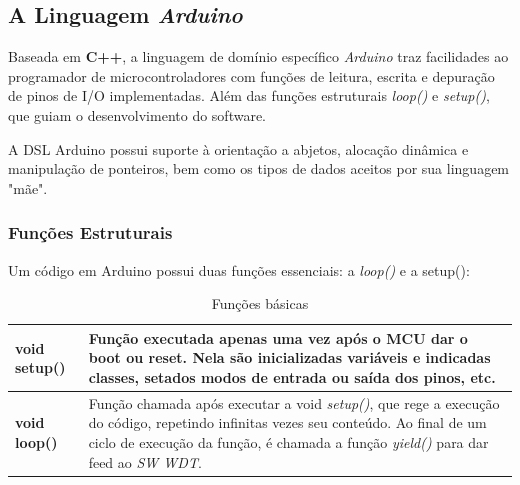 \documentclass[
12pt,				%
openany,			%
twoside,			%
a4paper,			%
english,			%
french,				%
spanish,			%
brazil,				%
]{abntex2}
\begin{document}
\subsection{A Linguagem \textit{Arduino}}
\label{sec:arduino}
Baseada em \textbf{\textsf{C++}}, a linguagem de domínio específico \textit{Arduino} traz facilidades ao programador de microcontroladores com funções de leitura, escrita e depuração de pinos de I/O implementadas. Além das funções estruturais \emph{loop()} e \emph{setup()}, que guiam o desenvolvimento do software.

A DSL Arduino possui suporte à orientação a abjetos, alocação dinâmica e manipulação de ponteiros, bem como os tipos de dados aceitos por sua linguagem "mãe".

\subsubsection{Funções Estruturais}
Um código em Arduino possui duas funções essenciais: a \textit{loop()} e a setup():

\begin{table}[!ht]
    \centering
    \label{Funcoes-basicas}
    \caption{Funções básicas}
    \footnotesize{
        \begin{tabular}{>{\bfseries}lp{5.35cm}}
            \toprule

            void setup() & Função executada apenas uma vez após o MCU dar o boot ou reset. Nela são inicializadas variáveis e indicadas classes, setados modos de entrada ou saída dos pinos, etc. \\\midrule
            void loop() & Função chamada após executar a void \textit{setup()}, que rege a execução do código, repetindo infinitas vezes seu conteúdo. Ao final de um ciclo de execução da função, é chamada a função \textit{yield()} para dar feed ao \emph{SW WDT}. \\\bottomrule
        \end{tabular}
    }
\end{table}
\end{document}
